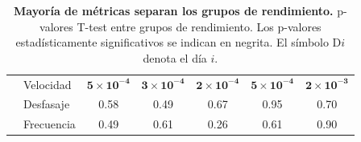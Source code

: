 \begin{table}[htbp]
\begin{tabular}{clccccc}
                                                                      & Velocidad         & $\mathbf{5\times 10^{-4}}$                        & $\mathbf{3\times 10^{-4}}$ & $\mathbf{2\times 10^{-4}}$ & $\mathbf{5\times 10^{-4}}$ & $\mathbf{2\times 10^{-3}}$ \\
                                                                      & Desfasaje         & 0.58                                              & 0.49                       & 0.67                       & 0.95                       & 0.70                       \\
                                                                      & Frecuencia        & 0.49                                              & 0.61                       & 0.26                       & 0.61                       & 0.90
    \end{tabular}
    \caption{\textbf{Mayoría de métricas separan los grupos de rendimiento.} p-valores T-test entre grupos de rendimiento. Los p-valores estadísticamente significativos se indican en negrita. El símbolo D$i$ denota el día $i$.}
    \label{tab:pvalores-t-test}
\end{table}